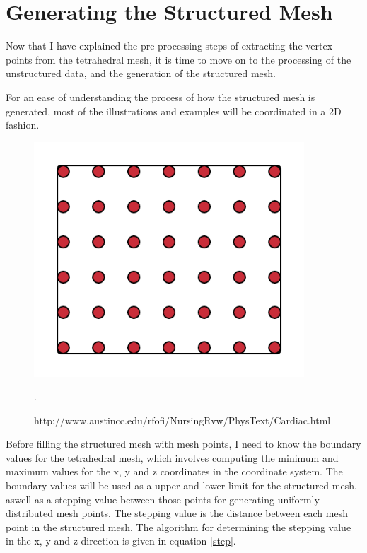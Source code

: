 \section{Generating the Structured Mesh}
\label{generating_the structured_mesh}
Now that I have explained the pre processing steps of extracting the vertex points from the tetrahedral mesh, it is time to move on to the processing of the unstructured data, and the generation of the structured mesh.

For an ease of understanding the process of how the structured mesh is generated, most of the illustrations and examples will be coordinated in a 2D fashion.

\begin{figure}[h]
 \centering 
     \includegraphics[width=0.9\textwidth]{bilder/m_grid_points}
     \caption{http://www.austincc.edu/rfofi/NursingRvw/PhysText/Cardiac.html}.
     \label{m_grid_points.png}
\end{figure}

Before filling the structured mesh with mesh points, I need to know the boundary values for the tetrahedral mesh, which involves computing the minimum and maximum values for the x, y and z coordinates in the coordinate system. The boundary values will be used as a upper and lower limit for the structured mesh, aswell as a stepping value between those points for generating uniformly distributed mesh points. The stepping value is the distance between each mesh point in the structured mesh. The algorithm for determining the stepping value in the x, y and z direction is given in equation \ref{step}.

